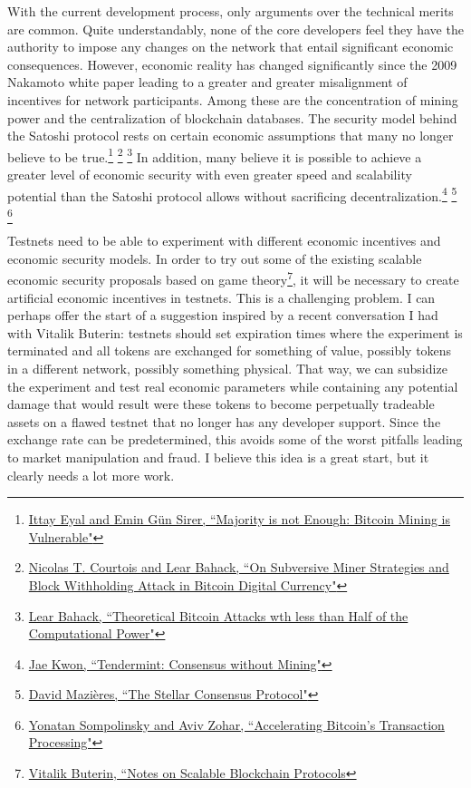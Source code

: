 \documentclass{article}
\begin{document}
With the current development process, only arguments over the technical merits are common. Quite understandably, none of the core developers feel they have the authority to impose any changes on the network that entail significant economic consequences. However, economic reality has changed significantly since the 2009 Nakamoto white paper leading to a greater and greater misalignment of incentives for network participants. Among these are the concentration of mining power and the centralization of blockchain databases. The security model behind the Satoshi protocol rests on certain economic assumptions that many no longer believe to be true.\footnote{\href{http://fc14.ifca.ai/papers/fc14_submission_82.pdf}{Ittay Eyal and Emin G{\"u}n Sirer, ``Majority is not Enough: Bitcoin Mining is Vulnerable"}} \footnote{\href{http://arxiv.org/pdf/1402.1718.pdf}{Nicolas T. Courtois and Lear Bahack, ``On Subversive Miner Strategies and Block Withholding Attack in Bitcoin Digital Currency"}} \footnote{\href{http://arxiv.org/pdf/1312.7013v1.pdf}{Lear Bahack, ``Theoretical Bitcoin Attacks wth less than Half of the Computational Power"}} In addition, many believe it is possible to achieve a greater level of economic security with even greater speed and scalability potential than the Satoshi protocol allows without sacrificing decentralization.\footnote{\href{http://tendermint.com/docs/tendermint.pdf}{Jae Kwon, ``Tendermint: Consensus without Mining"}} \footnote{\href{https://www.stellar.org/papers/stellar-consensus-protocol.pdf}{David Mazi\`{e}res, ``The Stellar Consensus Protocol"}} \footnote{\href{https://eprint.iacr.org/2013/881.pdf}{Yonatan Sompolinsky and Aviv Zohar, ``Accelerating Bitcoin's Transaction Processing"}}

Testnets need to be able to experiment with different economic incentives and economic security models. In order to try out some of the existing scalable economic security proposals based on game theory\footnote{\href{https://github.com/vbuterin/scalability_paper/blob/master/scalability.pdf}{Vitalik Buterin, ``Notes on Scalable Blockchain Protocols}}, it will be necessary to create artificial economic incentives in testnets. This is a challenging problem. I can perhaps offer the start of a suggestion inspired by a recent conversation I had with Vitalik Buterin: testnets should set expiration times where the experiment is terminated and all tokens are exchanged for something of value, possibly tokens in a different network, possibly something physical. That way, we can subsidize the experiment and test real economic parameters while containing any potential damage that would result were these tokens to become perpetually tradeable assets on a flawed testnet that no longer has any developer support. Since the exchange rate can be predetermined, this avoids some of the worst pitfalls leading to market manipulation and fraud. I believe this idea is a great start, but it clearly needs a lot more work.
\end{document}
